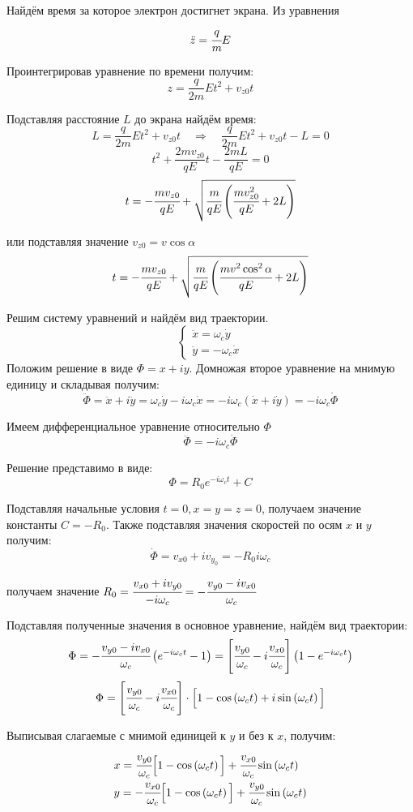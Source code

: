Найдём время за которое электрон достигнет экрана. Из уравнения 
\[ \ddot{z} = \cfrac{q}{m}E \]

Проинтегрировав уравнение по времени получим:
\[
	z = \frac{q}{2m}Et^2 + v_{z0}t
\]

Подставляя расстояние \( L \) до экрана найдём время:
\[
	L = \frac{q}{2m}Et^2 + v_{z0}t \quad\Rightarrow\quad
	\frac{q}{2m}Et^2 + v_{z0}t - L = 0
\]
\[
	t^2 + \frac{2mv_{z0}}{qE}t - \frac{2mL}{qE} = 0
\]
\[
	t = -\cfrac{mv_{z0}}{qE} + 
	\sqrt{ \cfrac{m}{qE}\left( \cfrac{mv^2_{z0}}{qE} + 2L \right)}
\]

или подставляя значение \( v_{z0} = v\cos\alpha \)
\[
	t = -\cfrac{mv_{z0}}{qE} + 
	\sqrt{ \cfrac{m}{qE}\left( \cfrac{mv^2\cos^2\alpha}{qE} + 2L \right)}
\]

Решим систему уравнений и найдём вид траектории.
\[
	\left\{ \begin{array}{ll}
		\ddot{x} = \omega_c\dot{y} \\
		\ddot{y} = -\omega_c\dot{x}
	\end{array}\right.
\]
Положим решение в виде \( \Phi = x + iy \). Домножая второе уравнение на 
мнимую единицу и складывая получим:
\[
	\ddot{\Phi} = \ddot{x} + i\ddot{y} = 
	\omega_c\dot{y} - i\omega_c\dot{x} = 
	-i\omega_c\left( \dot{x} + i\dot{y} \right) = 
	-i\omega_c\dot{\Phi}
\]

Имеем дифференциальное уравнение относительно \( \Phi \)
\[\ddot{\Phi} = -i\omega_c\dot{\Phi} \]

Решение представимо в виде:
\[
	\Phi = R_0 e^{-i\omega_c t} + C
\]

Подставляя начальные условия \( t = 0, x = y = z = 0 \), получаем значение 
константы \( C = -R_0 \). Также подставляя значения скоростей по осям 
\( x \) и \( y \) получим:
\[
	\dot{\Phi} = v_{x0} + iv_{y_0} = -R_0 i\omega_c
\]

получаем значение 
\( 
	R_0  = \cfrac{v_{x0} + iv_{y0}}{-i\omega_c} = 
	-\cfrac{v_{y0} - iv_{x0}}{\omega_c} 
\)

Подставляя полученные значения в основное уравнение, найдём вид траектории:
\[
	\Phi = -\cfrac{v_{y0} - iv_{x0}}{\omega_c} 
	\left( e^{-i\omega_c t} - 1 \right ) = 
	\left[ \cfrac{v_{y0}}{\omega_c} - i \cfrac{v_{x0}}{\omega_c} \right]
	\left( 1 - e^{-i\omega_c t} \right)
\]
\[
	\Phi = 
	\left[ \cfrac{v_{y0}}{\omega_c} - i \cfrac{v_{x0}}{\omega_c} \right]
	\cdot\Big[ 1 - \cos\left(\omega_c t\right) + 
		i\sin\left( \omega_c t\right) \Big] 
\]

Выписывая слагаемые с мнимой единицей к \( y \) и без к \( x \), получим:
\[
	\begin{array}{ll}
		x = \cfrac{v_{y0}}{\omega_c}
			\Big[ 1 - \cos\left( \omega_c t \right) \Big] + 
			\cfrac{v_{x0}}{\omega_c}\sin\left( \omega_c t \right) \\
		y = -\cfrac{v_{x0}}{\omega_c}
			\Big[ 1 - \cos\left( \omega_c t \right) \Big] + 
			\cfrac{v_{y0}}{\omega_c}\sin\left( \omega_c t \right) \\
	\end{array}
\]

